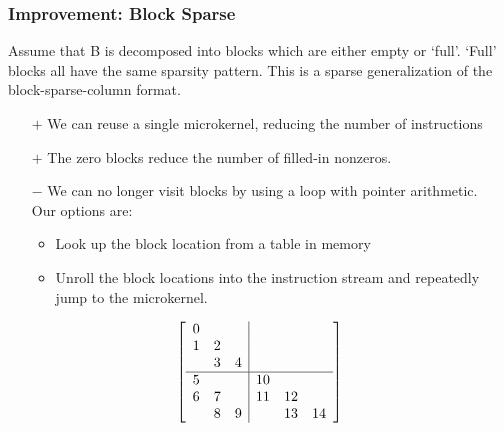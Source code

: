 \documentclass[9pt]{beamer}
\begin{document}
\begin{frame}[fragile]
  \frametitle{Improvement: Block Sparse}
  Assume that B is decomposed into blocks which are either empty or `full'. `Full' blocks all have the same sparsity pattern. This is a sparse generalization of the block-sparse-column format.

  \begin{itemize}
  \item[$+$] We can reuse a single microkernel, reducing the number of instructions
  \item[$+$] The zero blocks reduce the number of filled-in nonzeros.
  \item[$-$] We can no longer visit blocks by using a loop with pointer arithmetic. \\Our options are:
    \begin{itemize}
    \item Look up the block location from a table in memory
    \item Unroll the block locations into the instruction stream and repeatedly jump to the microkernel.
    \end{itemize}
  \end{itemize}


      \[
      \left[
          \begin{array}{c c c | c c c }
          0 &   &   &    &    &    \\
          1 & 2 &   &    &    &    \\
            & 3 & 4 &    &    &    \\
          \hline
          5 &   &   & 10 &    &    \\
          6 & 7 &   & 11 & 12 &    \\
            & 8 & 9 &    & 13 & 14 \\
          \end{array}
          \right]
      \]
\end{frame}
\end{document}
